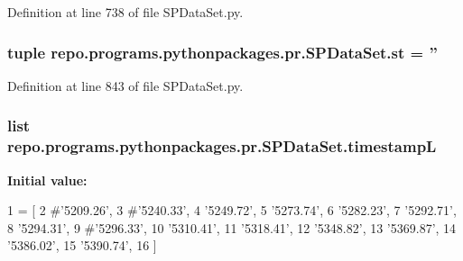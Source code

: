 Definition at line 738 of file S\-P\-Data\-Set.\-py.

\hypertarget{namespacerepo_1_1programs_1_1pythonpackages_1_1pr_1_1SPDataSet_aa809f797a727977783e89201eb7515ba}{
\subsubsection[{st}]{\setlength{\rightskip}{0pt plus 5cm}tuple repo.\-programs.\-pythonpackages.\-pr.\-S\-P\-Data\-Set.\-st = ''}}\label{namespacerepo_1_1programs_1_1pythonpackages_1_1pr_1_1SPDataSet_aa809f797a727977783e89201eb7515ba}


Definition at line 843 of file S\-P\-Data\-Set.\-py.

\hypertarget{namespacerepo_1_1programs_1_1pythonpackages_1_1pr_1_1SPDataSet_ab977d64bf78ed1ce32101398d66e2673}{
\subsubsection[{timestamp\-L}]{\setlength{\rightskip}{0pt plus 5cm}list repo.\-programs.\-pythonpackages.\-pr.\-S\-P\-Data\-Set.\-timestamp\-L}}\label{namespacerepo_1_1programs_1_1pythonpackages_1_1pr_1_1SPDataSet_ab977d64bf78ed1ce32101398d66e2673}
{\bfseries Initial value\-:}
\begin{DoxyCode}
1 = [
2                     \textcolor{comment}{#'5209.26',}
3                     \textcolor{comment}{#'5240.33',}
4                     \textcolor{stringliteral}{'5249.72'},
5                     \textcolor{stringliteral}{'5273.74'},
6                     \textcolor{stringliteral}{'5282.23'},
7                     \textcolor{stringliteral}{'5292.71'},
8                     \textcolor{stringliteral}{'5294.31'},
9                     \textcolor{comment}{#'5296.33',}
10                     \textcolor{stringliteral}{'5310.41'},
11                     \textcolor{stringliteral}{'5318.41'},
12                     \textcolor{stringliteral}{'5348.82'},
13                     \textcolor{stringliteral}{'5369.87'},
14                     \textcolor{stringliteral}{'5386.02'},
15                     \textcolor{stringliteral}{'5390.74'},
16                 ]
\end{DoxyCode}


